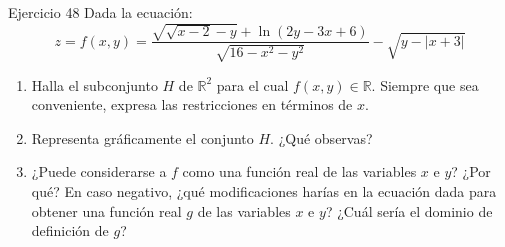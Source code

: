 \documentclass[aspectratio=169, 10pt]{beamer}
\begin{document}
\begin{frame}{Ejercicio 48}
  \small
  Dada la ecuación:
  \[
    z = f(x,y) = \frac{\sqrt{\sqrt{x-2}-y} + \ln(2y - 3x + 6)}{\sqrt{16 - x^2 - y^2}} - \sqrt{y - |x+3|}
  \]
  \begin{enumerate}
    \item[(A)] Halla el subconjunto $H$ de $\mathbb{R}^2$ para el cual $f(x,y) \in \mathbb{R}$. Siempre que sea conveniente, expresa las restricciones en términos de $x$.
    \item[(B)] Representa gráficamente el conjunto $H$. ¿Qué observas?
    \item[(C)] ¿Puede considerarse a $f$ como una función real de las variables $x$ e $y$? ¿Por qué? En caso negativo, ¿qué modificaciones harías en la ecuación dada para obtener una función real $g$ de las variables $x$ e $y$? ¿Cuál sería el dominio de definición de $g$?
  \end{enumerate}
  \vfill
\end{frame}
\end{document}
